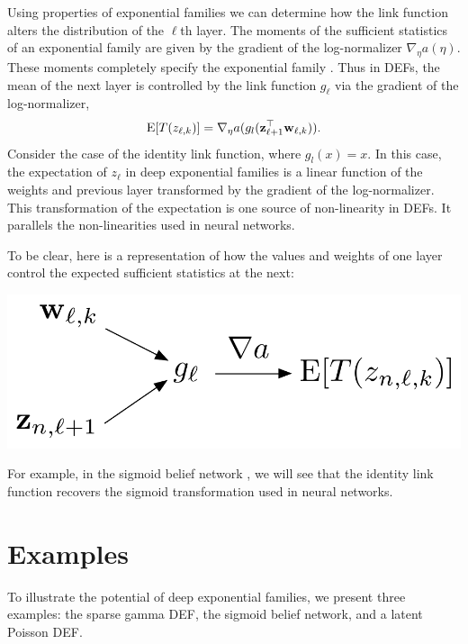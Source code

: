 \documentclass[twoside]{article}
\begin{document}
Using properties of exponential families we can determine how the link
function alters the distribution of the $\ell$th layer. The moments
of the sufficient statistics of an exponential family are given by the
gradient of the log-normalizer $\nabla_\eta a(\eta)$. These moments
completely specify the exponential family \citep{Brown:1986}.
Thus in DEFs, the mean of the next layer is controlled by the link
function $g_\ell$ via the gradient of the log-normalizer,
\begin{align} 
\textrm{E}[T(z_{\ell, k})] = \nabla_\eta a(g_l(\boldsymbol{\mathbf{z}}_{\ell+1}^\top \boldsymbol{\mathbf{w}}_{\ell,k})).
\label{eq:link_prop}
\end{align}
Consider the case of the identity link function, where $g_l(x) = x$. 
In this case, the expectation of $z_\ell$ in deep exponential families is a linear function
of the weights and previous layer 
transformed by the gradient of the log-normalizer. This transformation of the expectation
is one source of non-linearity in DEFs. It parallels the non-linearities used in neural networks. 

To be clear, here is a representation of how the values and weights of one
layer control the expected sufficient statistics at the next:

\begin{minipage}{0.5\textwidth}
\begin{center}
    \includegraphics[width=0.5\columnwidth]{../fig/pdf/def_nn2}
\end{center}

\end{minipage}
\vspace{-0.1cm}

For example, in the sigmoid belief network \citep{Neal:1990},  we will see that the identity link
function recovers the sigmoid transformation used in neural networks.

\section{Examples}

To illustrate the potential of deep exponential families,
we present three examples: the sparse gamma DEF, the sigmoid belief
network, and a latent Poisson DEF. 
\end{document}
